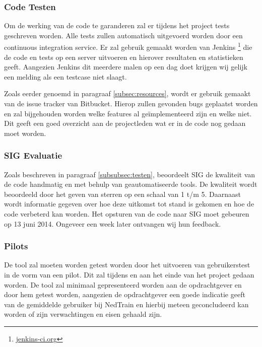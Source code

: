 \subsubsection{Code Testen}
Om de werking van de code te garanderen zal er tijdens het project tests geschreven worden. Alle tests zullen automatisch uitgevoerd worden door een continuous integration service. Er zal gebruik gemaakt worden van Jenkins \footnote{\url{jenkins-ci.org}} die de code en tests op een server uitvoeren en hierover resultaten en statistieken geeft. Aangezien Jenkins dit meerdere malen op een dag doet krijgen wij gelijk een melding als een testcase niet slaagt.

Zoals eerder genoemd in paragraaf \ref{subsec:resources}, wordt er gebruik gemaakt van de issue tracker van Bitbucket. Hierop zullen gevonden bugs geplaatst worden en zal bijgehouden worden welke features al ge\"implementeerd zijn en welke niet. Dit geeft een goed overzicht aan de projectleden wat er in de code nog gedaan moet worden.

\subsubsection{SIG Evaluatie}
Zoals beschreven in paragraaf \ref{subsubsec:testen}, beoordeelt SIG de kwaliteit van de code handmatig en met behulp van geautomatiseerde tools. De kwaliteit wordt beoordeeld door het geven van sterren op een schaal van 1 t/m 5. Daarnaast wordt informatie gegeven over hoe deze uitkomst tot stand is gekomen en hoe de code verbeterd kan worden. Het opsturen van de code naar SIG moet gebeuren op 13 juni 2014. Ongeveer een week later ontvangen wij hun feedback.

\subsubsection{Pilots}
De tool zal moeten worden getest worden door het uitvoeren van gebruikerstest in de vorm van een pilot. Dit zal tijdens en aan het einde van het project gedaan worden. De tool zal minimaal gepresenteerd worden aan de opdrachtgever en door hem getest worden, aangezien de opdrachtgever een goede indicatie geeft van de gemiddelde gebruiker bij NedTrain en hierbij meteen geconcludeerd kan worden of zijn verwachtingen en eisen gehaald zijn.
